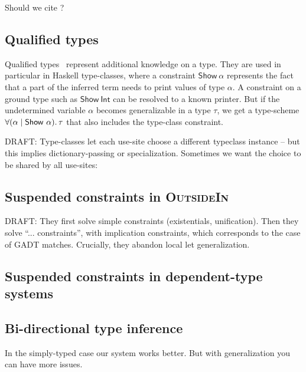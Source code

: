 \documentclass[acmsmall,screen,nonacm,review]{acmart}
\begin{document}
Should we cite \cite{Leijen-Ye/prefix@pldi2025} ?

\subsection{Qualified types}

Qualified types~\citep*{TODO} represent additional knowledge on a type. They
are used in particular in Haskell type-classes, where a constraint
$\mathsf{Show}~\alpha$ represents the fact that a part of the inferred term
needs to print values of type $\alpha$. A constraint on a ground type such
as $\mathsf{Show}~\mathsf{Int}$ can be resolved to a known printer. But if
the undetermined variable $\alpha$ becomes generalizable in a type $\tau$,
we get a type-scheme $\forall {(\alpha \mid \mathsf{Show}~\alpha)}.\,{\tau}$ that
also includes the type-class constraint.

DRAFT: Type-classes let each use-site choose a different typeclass instance
-- but this implies dictionary-passing or specialization. Sometimes we want
the choice to be shared by all use-sites:


\subsection{Suspended constraints in \textsc{OutsideIn}}

DRAFT: They first solve simple constraints (existentials,
unification). Then they solve ``... constraints'', with implication
constraints, which corresponds to the case of GADT matches. Crucially, they
abandon local let generalization.

\subsection{Suspended constraints in dependent-type systems}


\subsection{Bi-directional type inference}


In the simply-typed case our system works better. But with generalization
you can have more issues.


\end{document}
